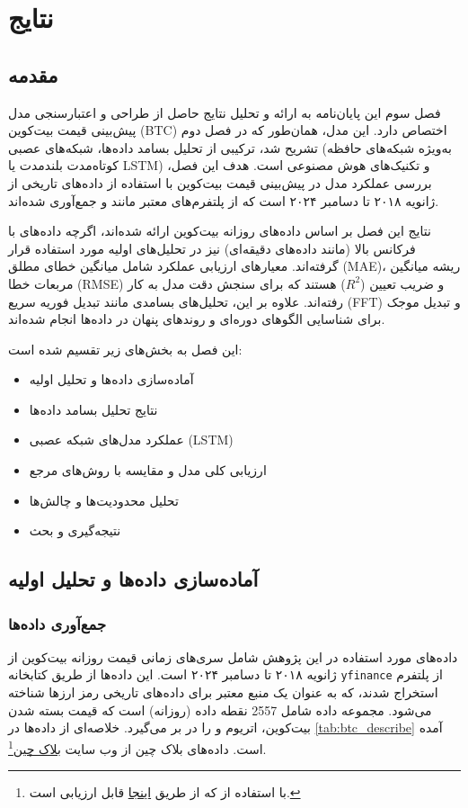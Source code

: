 \chapter{نتایج}
\label{chap:results}

\section{مقدمه}
فصل سوم این پایان‌نامه به ارائه و تحلیل نتایج حاصل از طراحی و اعتبارسنجی مدل پیش‌بینی قیمت بیت‌کوین (BTC) اختصاص دارد. این مدل، همان‌طور که در فصل دوم تشریح شد، ترکیبی از تحلیل بسامد داده‌ها، شبکه‌های عصبی (به‌ویژه شبکه‌های حافظه کوتاه‌مدت بلندمدت یا LSTM) و تکنیک‌های هوش مصنوعی است. هدف این فصل، بررسی عملکرد مدل در پیش‌بینی قیمت بیت‌کوین با استفاده از داده‌های تاریخی از ژانویه ۲۰۱۸ تا دسامبر ۲۰۲۴ است که از پلتفرم‌های معتبر مانند  و  جمع‌آوری شده‌اند. 

نتایج این فصل بر اساس داده‌های روزانه بیت‌کوین ارائه شده‌اند، اگرچه داده‌های با فرکانس بالا (مانند داده‌های دقیقه‌ای) نیز در تحلیل‌های اولیه مورد استفاده قرار گرفته‌اند. معیارهای ارزیابی عملکرد شامل میانگین خطای مطلق (MAE)، ریشه میانگین مربعات خطا (RMSE) و ضریب تعیین (\(R^2\)) هستند که برای سنجش دقت مدل به کار رفته‌اند. علاوه بر این، تحلیل‌های بسامدی مانند تبدیل فوریه سریع (FFT) و تبدیل موجک برای شناسایی الگوهای دوره‌ای و روندهای پنهان در داده‌ها انجام شده‌اند.

این فصل به بخش‌های زیر تقسیم شده است:
\begin{itemize}
	\item آماده‌سازی داده‌ها و تحلیل اولیه
	\item نتایج تحلیل بسامد داده‌ها
	\item عملکرد مدل‌های شبکه عصبی (LSTM)
	\item ارزیابی کلی مدل و مقایسه با روش‌های مرجع
	\item تحلیل محدودیت‌ها و چالش‌ها
	\item نتیجه‌گیری و بحث
\end{itemize}

\section{آماده‌سازی داده‌ها و تحلیل اولیه}
\label{sec:data_preparation}

\subsection{جمع‌آوری داده‌ها}
داده‌های مورد استفاده در این پژوهش شامل سری‌های زمانی قیمت روزانه بیت‌کوین از ژانویه ۲۰۱۸ تا دسامبر ۲۰۲۴ است. این داده‌ها از طریق کتابخانه \texttt{yfinance} از پلتفرم  استخراج شدند، که به عنوان یک منبع معتبر برای داده‌های تاریخی رمز ارزها شناخته می‌شود. مجموعه داده شامل 2557 نقطه داده (روزانه) است که قیمت بسته شدن  بیت‌کوین، اتریوم و  را در بر می‌گیرد. خلاصه‌ای از داده‌ها در \ref{tab:btc_describe} آمده است. داده‌های بلاک چین از وب سایت \href{https://www.blockchain.com/}{بلاک چین}\footnote{با استفاده از  که از طریق \href{https://api.blockchain.info/}{اینجا} قابل ارزیابی است.}.
 
